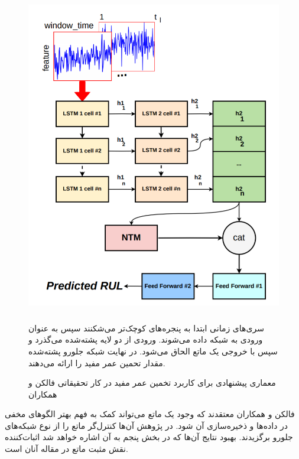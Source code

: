 \begin{figure}[!h]
\begin{center}
\includegraphics[height=14cm]{RUL.png}
\end{center}
\caption{معماری پیشنهادی برای کاربرد تخمین عمر مفید در کار تحقیقاتی فالکن و همکاران}
\medskip
\small
سری‌های زمانی ابتدا به پنجره‌های کوچک‌تر می‌شکنند سپس به عنوان ورودی به شبکه داده می‌شوند. ورودی از دو لایه  پشته‌شده می‌گذرد و سپس با خروجی یک ماتع الحاق می‌شود. در نهایت شبکه جلورو پشته‌شده مقدار تحمین عمر مفید را ارائه می‌دهند. 
\end{figure}

فالکن و همکاران معتقدند که وجود یک ماتع می‌تواند کمک به فهم بهتر الگوهای مخفی در داده‌ها و ذخیره‌سازی آن شود. در پژوهش آن‌ها کنترل‌گر ماتع را از نوع شبکه‌های جلورو برگزیدند.\cite{falcon2020neural} بهبود نتایج آن‌ها که در بخش پنجم به آن اشاره خواهد شد اثبات‌کننده نقش مثبت ماتع در مقاله آنان است.
